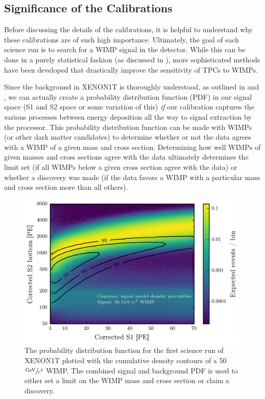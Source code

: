 \subsection{Significance of the Calibrations}

Before discussing the details of the calibrations, it is helpful to understand why these calibrations are of such high importance.  Ultimately, the goal of each science run is to search for a WIMP signal in the detector.  While this can be done in a purely statistical fashion (as discussed in ), more sophisticated methods have been developed that drastically improve the sensitivity of TPCs to WIMPs.  

Since the background in XENON1T is thoroughly understood, as outlined in  and , we can actually create a probability distribution function (PDF) in our signal space (S1 and S2 space or some variation of this) \textit{if} our calibration captures the various processes between energy deposition all the way to signal extraction by the processor.  This probability distribution function can be made with WIMPs (or other dark matter candidates) to determine whether or not the data agrees with a WIMP of a given mass and cross section.  Determining how well WIMPs of given masses and cross sections agree with the data ultimately determines the limit set (if all WIMPs below a given cross section agree with the data) or whether a discovery was made (if the data favors a WIMP with a particular mass and cross section more than all others).

\begin{figure}
        \centering
	\includegraphics[width=0.99\textwidth]{xe1t_background_pdf}
	\caption{The probability distribution function for the first science run of XENON1T plotted with the cumulative density contours of a 50 $\sfrac{\textrm{GeV}}{\textrm{c}^2}$ WIMP.  The combined signal and  background PDF is used to either set a limit on the WIMP mass and cross section or claim a discovery.}
	\label{fig:xe1t_background_pdf}
\end{figure}

